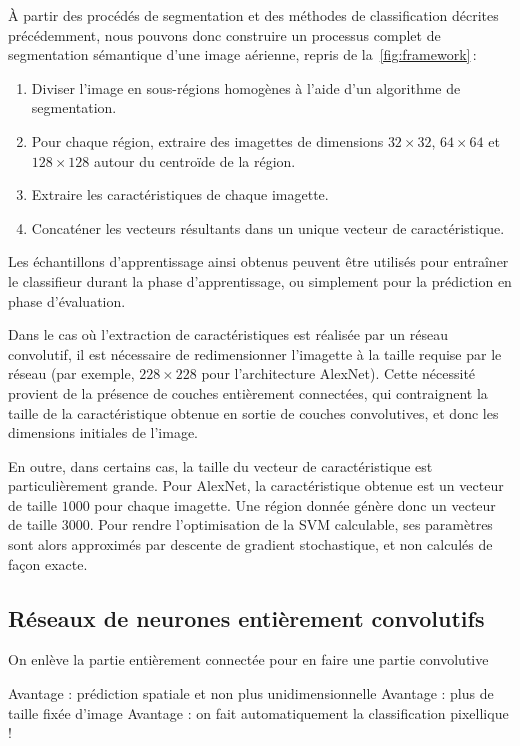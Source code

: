 À partir des procédés de segmentation et des méthodes de classification décrites précédemment, nous pouvons donc construire un processus complet de segmentation sémantique d'une image aérienne, repris de la~\cref{fig:framework}\,:
\begin{enumerate}
    \item Diviser l'image en sous-régions homogènes à l'aide d'un algorithme de segmentation.
    \item Pour chaque région, extraire des imagettes de dimensions $32\times32$, $64\times64$ et $128\times128$ autour du centroïde de la région.
    \item Extraire les caractéristiques de chaque imagette.
    \item Concaténer les vecteurs résultants dans un unique vecteur de caractéristique.
\end{enumerate}

Les échantillons d'apprentissage ainsi obtenus peuvent être utilisés pour entraîner le classifieur durant la phase d'apprentissage, ou simplement pour la prédiction en phase d'évaluation.

Dans le cas où l'extraction de caractéristiques est réalisée par un réseau convolutif, il est nécessaire de redimensionner l'imagette à la taille requise par le réseau (par exemple, $228\times228$ pour l'architecture AlexNet). Cette nécessité provient de la présence de couches entièrement connectées, qui contraignent la taille de la caractéristique obtenue en sortie de couches convolutives, et donc les dimensions initiales de l'image.

En outre, dans certains cas, la taille du vecteur de caractéristique est particulièrement grande. Pour AlexNet, la caractéristique obtenue est un vecteur de taille $1 000$ pour chaque imagette. Une région donnée génère donc un vecteur de taille $3 000$. Pour rendre l'optimisation de la SVM calculable, ses paramètres sont alors approximés par descente de gradient stochastique, et non calculés de façon exacte.

\subsection{Réseaux de neurones entièrement convolutifs}

On enlève la partie entièrement connectée pour en faire une partie convolutive

Avantage : prédiction spatiale et non plus unidimensionnelle
Avantage : plus de taille fixée d'image
Avantage : on fait automatiquement la classification pixellique !

